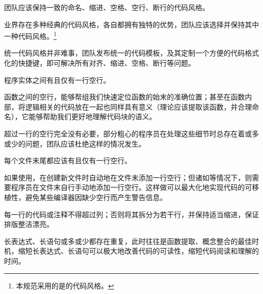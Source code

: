 \begin{content}

\begin{regulation}
团队应该保持一致的命名、缩进、空格、空行、断行的代码风格。
\end{regulation}

业界存在多种经典的代码风格，各自都拥有独特的优势，团队应该选择并保持其中一种代码风格。\footnote{本规范采用的是的代码风格。}

\begin{enum}
\end{enum}

统一代码风格并非难事，团队发布统一的代码模板，及其定制一个方便的代码格式化的快捷键，即可解决所有对齐、缩进、空格、断行等问题。

\begin{regulation}
程序实体之间有且仅有一行空行。
\end{regulation}

函数之间的空行，能够帮组我们快速定位函数的始末的准确位置；甚至在函数内部，将逻辑相关的代码放在一起也同样具有意义（理论应该提取该函数，并合理命名），它能够帮助我们更好地理解代码块的语义。

超过一行的空行完全没有必要，部分粗心的程序员在处理这些细节时总存在着或多或少的问题，团队应该杜绝这样的情况发生。

\begin{regulation}
每个文件末尾都应该有且仅有一行空行。
\end{regulation}

如果使用，在创建新文件时自动地在文件末添加一行空行；但诸如等情况下，则需要程序员在文件末自行手动地添加一行空行。这样做可以最大化地实现代码的可移植性，避免某些编译器因缺少空行而产生警告信息。

\begin{regulation}
每一行的代码或注释不得超过列；否则将其拆分为若干行，并保持适当缩进，保证排版整洁漂亮。
\end{regulation}

长表达式、长语句或多或少都存在重复，此时往往是函数提取、概念整合的最佳时机，缩短长表达式、长语句可以极大地改善代码的可读性，缩短代码阅读和理解的时间。

\end{content}
